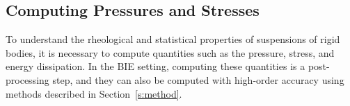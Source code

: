 \documentclass[preprint, 10pt]{elsarticle}
\begin{document}
%
%
\subsection{Computing Pressures and Stresses}
To understand the rheological and statistical properties of suspensions
of rigid bodies, it is necessary to compute quantities such as the
pressure, stress, and energy dissipation.  In the BIE setting, computing
these quantities is a post-processing step, and they can also be
computed with high-order accuracy using methods described in
Section~\ref{s:method}.
\end{document}
